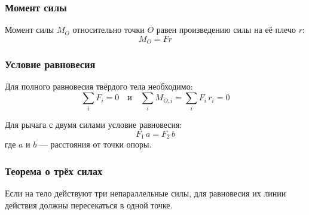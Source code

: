 \documentclass{article}
\begin{document}
\subsubsection*{Момент силы}
Момент силы $M_O$ относительно точки $O$ равен произведению силы на её плечо $r$:
\[
M_O = Fr
\]

\subsubsection*{Условие равновесия}
Для полного равновесия твёрдого тела необходимо:
\[
\sum_i F_i = 0 \quad\text{и}\quad \sum_i M_{O,i} = \sum_i F_i\,r_i = 0
\]

Для рычага с двумя силами условие равновесия:
\[
F_1\,a = F_2\,b
\]
где $a$ и $b$ — расстояния от точки опоры.

\subsubsection*{Теорема о трёх силах}
Если на тело действуют три непараллельные силы, для равновесия их линии действия должны пересекаться в одной точке.
\end{document}
